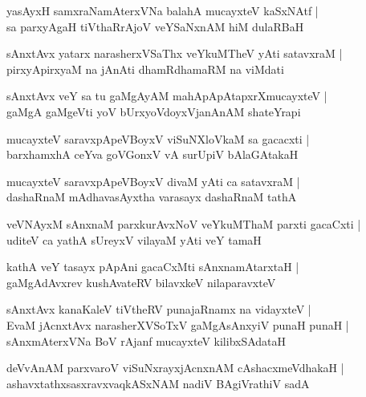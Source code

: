 \documentclass[twoside,12pt,openright]{book}
\newcounter{shloka}[chapter]
\begin{document}
\begin{shloka}%
yasAyxH samxraNamAterxVNa balahA mucayxteV kaSxNAtf |\\
sa parxyAgaH tiVthaRrAjoV veYSaNxnAM hiM dulaRBaH 
\end{shloka}

\begin{shloka}%
sAnxtAvx yatarx narasherxVSaThx veYkuMTheV yAti satavxraM |\\
pirxyApirxyaM na jAnAti dhamRdhamaRM na viMdati 
\end{shloka}

\begin{shloka}%
sAnxtAvx veY sa tu gaMgAyAM mahApApAtapxrXmucayxteV |\\
gaMgA gaMgeVti yoV bUrxyoVdoyxVjanAnAM shateYrapi
\end{shloka}

\begin{shloka}%
mucayxteV saravxpApeVBoyxV viSuNXloVkaM sa gacacxti |\\
barxhamxhA ceYva goVGonxV vA surUpiV bAlaGAtakaH
\end{shloka}

\begin{shloka}%
mucayxteV saravxpApeVBoyxV divaM yAti ca satavxraM |\\
dashaRnaM mAdhavasAyxtha varasayx dashaRnaM tathA 
\end{shloka}

\begin{shloka}%
veVNAyxM sAnxnaM parxkurAvxNoV veYkuMThaM parxti gacaCxti |\\
uditeV ca yathA sUreyxV vilayaM yAti veY tamaH 
\end{shloka}

\begin{shloka}%
kathA veY tasayx pApAni gacaCxMti sAnxnamAtarxtaH |\\
gaMgAdAvxrev kushAvateRV bilavxkeV nilaparavxteV 
\end{shloka}

\begin{shloka}%
sAnxtAvx kanaKaleV tiVtheRV punajaRnamx na vidayxteV |\\
EvaM jAcnxtAvx narasherXVSoTxV gaMgAsAnxyiV punaH punaH |\\
sAnxmAterxVNa BoV rAjanf mucayxteV kilibxSAdataH 
\end{shloka}

\begin{shloka}%
deVvAnAM parxvaroV viSuNxrayxjAcnxnAM cAshacxmeVdhakaH |\\
ashavxtathxsasxravxvaqkASxNAM nadiV BAgiVrathiV sadA 
\end{shloka}
\end{document}
